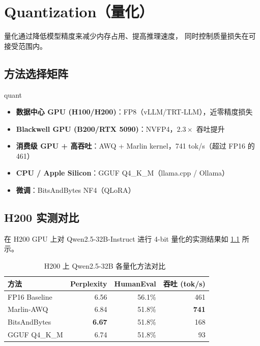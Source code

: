 \documentclass[
  customlatinfont = macos,
]{hkustthesis}
\begin{document}
\chapter{Quantization（量化）}
\label{ch:quantization}

量化通过降低模型精度来减少内存占用、提高推理速度，
同时控制质量损失在可接受范围内。

\section{方法选择矩阵}

\begin{insightbox}[量化方法速查]{quant}
\begin{itemize}[noitemsep]
  \item \textbf{数据中心 GPU (H100/H200)}：FP8（vLLM/TRT-LLM），近零精度损失
  \item \textbf{Blackwell GPU (B200/RTX 5090)}：NVFP4，$2.3\times$ 吞吐提升
  \item \textbf{消费级 GPU + 高吞吐}：AWQ + Marlin kernel，741 tok/s（超过 FP16 的 461）
  \item \textbf{CPU / Apple Silicon}：GGUF Q4\_K\_M（llama.cpp / Ollama）
  \item \textbf{微调}：BitsAndBytes NF4（QLoRA）
\end{itemize}
\end{insightbox}

\section{H200 实测对比}

在 H200 GPU 上对 Qwen2.5-32B-Instruct 进行 4-bit 量化的实测结果如
\cref{tab:quant-bench} 所示。

\begin{table}[H]
\centering\small
\caption{H200 上 Qwen2.5-32B 各量化方法对比~\cite{jarvislabs-quant}}
\label{tab:quant-bench}
\begin{tabularx}{\linewidth}{l r r r}
\toprule
\textbf{方法} & \textbf{Perplexity} & \textbf{HumanEval} & \textbf{吞吐 (tok/s)} \\
\midrule
FP16 Baseline  & 6.56 & 56.1\% & 461 \\
Marlin-AWQ     & 6.84 & 51.8\% & \textbf{741} \\
BitsAndBytes   & \textbf{6.67} & 51.8\% & 168 \\
GGUF Q4\_K\_M  & 6.74 & 51.8\% & 93 \\
\bottomrule
\end{tabularx}
\end{table}
\end{document}
